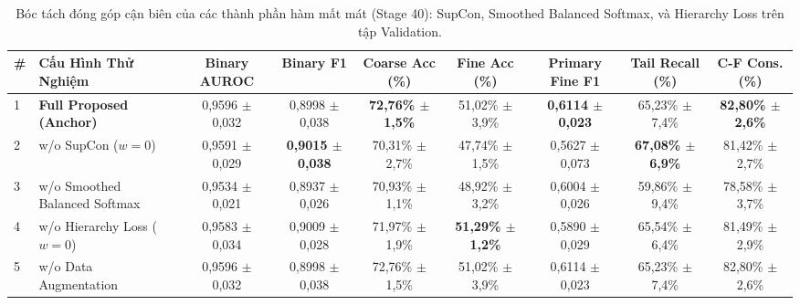 \begin{table}[t]
\centering
\small
\caption{Bóc tách đóng góp cận biên của các thành phần hàm mất mát (Stage 40): SupCon, Smoothed Balanced Softmax, và Hierarchy Loss trên tập Validation.}
\label{tab:ablation_loss_components}
\begin{adjustbox}{width=\textwidth}
\begin{tabular}{llccccccc}
\toprule
\textbf{\#} & \textbf{Cấu Hình Thử Nghiệm} & \textbf{Binary AUROC} & \textbf{Binary F1} & \textbf{Coarse Acc (\%)} & \textbf{Fine Acc (\%)} & \textbf{Primary Fine F1} & \textbf{Tail Recall (\%)} & \textbf{C-F Cons. (\%)} \\
\midrule
1 & \textbf{Full Proposed (Anchor)} & 0,9596 $\pm$ 0,032 & 0,8998 $\pm$ 0,038 & \textbf{72,76\% $\pm$ 1,5\%} & 51,02\% $\pm$ 3,9\% & \textbf{0,6114 $\pm$ 0,023} & 65,23\% $\pm$ 7,4\% & \textbf{82,80\% $\pm$ 2,6\%} \\
2 & w/o SupCon ($w=0$) & 0,9591 $\pm$ 0,029 & \textbf{0,9015 $\pm$ 0,038} & 70,31\% $\pm$ 2,7\% & 47,74\% $\pm$ 1,5\% & 0,5627 $\pm$ 0,073 & \textbf{67,08\% $\pm$ 6,9\%} & 81,42\% $\pm$ 2,7\% \\
3 & w/o Smoothed Balanced Softmax & 0,9534 $\pm$ 0,021 & 0,8937 $\pm$ 0,026 & 70,93\% $\pm$ 1,1\% & 48,92\% $\pm$ 3,2\% & 0,6004 $\pm$ 0,026 & 59,86\% $\pm$ 9,4\% & 78,58\% $\pm$ 3,7\% \\
4 & w/o Hierarchy Loss ($w=0$) & 0,9583 $\pm$ 0,034 & 0,9009 $\pm$ 0,028 & 71,97\% $\pm$ 1,9\% & \textbf{51,29\% $\pm$ 1,2\%} & 0,5890 $\pm$ 0,029 & 65,54\% $\pm$ 6,4\% & 81,49\% $\pm$ 2,9\% \\
5 & w/o Data Augmentation & 0,9596 $\pm$ 0,032 & 0,8998 $\pm$ 0,038 & 72,76\% $\pm$ 1,5\% & 51,02\% $\pm$ 3,9\% & 0,6114 $\pm$ 0,023 & 65,23\% $\pm$ 7,4\% & 82,80\% $\pm$ 2,6\% \\
\bottomrule
\end{tabular}
\end{adjustbox}
\end{table}
